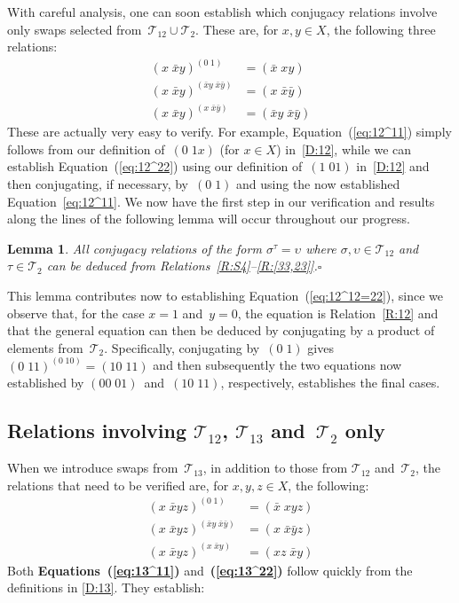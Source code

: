 \documentclass[a4paper,11pt]{article}
\numberwithin{equation}{section}
\newcommand{\eqstate}[1]{Equation~(\ref{#1})}
\newcommand{\swap}[2]{(#1\;#2)}
\newcommand{\Sw}[1]{\mathcal{T}_{#1}}
\newcommand{\qed}{\hspace*{\fill}$\square$}
\newtheorem{lemma}[thm]{Lemma}
\begin{document}
With careful analysis, one can soon establish which conjugacy
relations involve only swaps selected from~$\Sw{12} \cup \Sw{2}$.
These are, for $x,y \in X$, the following three relations:
\begin{align}
  \swap{x}{\bar{x}y}^{\swap{0}{1}} &= \swap{\bar{x}}{xy}
  \label{eq:12^11}
  \\
  \swap{x}{\bar{x}y}^{\swap{\bar{x}y}{\bar{x}\bar{y}}} &=
  \swap{x}{\bar{x}\bar{y}}
  \label{eq:12^22}
  \\
  \swap{x}{\bar{x}{y}}^{\swap{x}{\bar{x}\bar{y}}} &=
  \swap{\bar{x}y}{\bar{x}\bar{y}}
  \label{eq:12^12=22}
\end{align}
These are actually very easy to verify.  For
example, \eqstate{eq:12^11} simply follows from our definition
of~$\swap{0}{1x}$ (for $x \in X$) in~\eqref{D:12}, while we can
establish \eqstate{eq:12^22} using our definition of~$\swap{1}{01}$
in~\eqref{D:12} and then conjugating, if necessary, by~$\swap{0}{1}$
and using the now established Equation~\eqref{eq:12^11}.  We now have
the first step in our verification and results along the lines of the
following lemma will occur throughout our progress.

\begin{lemma}
  \label{lem:12^2}
  All conjugacy relations of the form $\sigma^{\tau} = \upsilon$ where
  $\sigma,\upsilon \in \Sw{12}$ and $\tau \in \Sw{2}$ can be deduced
  from Relations~\ref{R:S4}--\ref{R:[33,23]}.\qed
\end{lemma}

This lemma contributes now to establishing
\eqstate{eq:12^12=22}, since we observe that, for the case $x = 1$
and~$y = 0$, the equation is Relation~\ref{R:12} and that the general
equation can then be deduced by conjugating by a product of elements
from~$\Sw{2}$.  Specifically, conjugating by~$\swap{0}{1}$ gives
$\swap{0}{11}^{\swap{0}{10}} = \swap{10}{11}$ and then subsequently
the two equations now established by
$\swap{00}{01}$~and~$\swap{10}{11}$, respectively, establishes the
final cases.

\subsection{\boldmath Relations involving $\Sw{12}$, $\Sw{13}$
  and~$\Sw{2}$ only}

When we introduce swaps from~$\Sw{13}$, in addition to those from
$\Sw{12}$ and~$\Sw{2}$, the relations that need to be verified are,
for $x,y,z \in X$, the following:
\begin{align}
  \swap{x}{\bar{x}yz}^{\swap{0}{1}} &= \swap{\bar{x}}{xyz}
  \label{eq:13^11}
  \\
  \swap{x}{\bar{x}yz}^{\swap{\bar{x}y}{\bar{x}\bar{y}}} &=
  \swap{x}{\bar{x}\bar{y}z}
  \label{eq:13^22}
  \\
  \swap{x}{\bar{x}yz}^{\swap{x}{\bar{x}y}} &= \swap{xz}{\bar{x}y}
  \label{eq:13^12=22}
\end{align}
Both \textbf{Equations~(\ref{eq:13^11})} and~\textbf{(\ref{eq:13^22})}
follow quickly from the definitions in \eqref{D:13}.  They establish:
\end{document}
